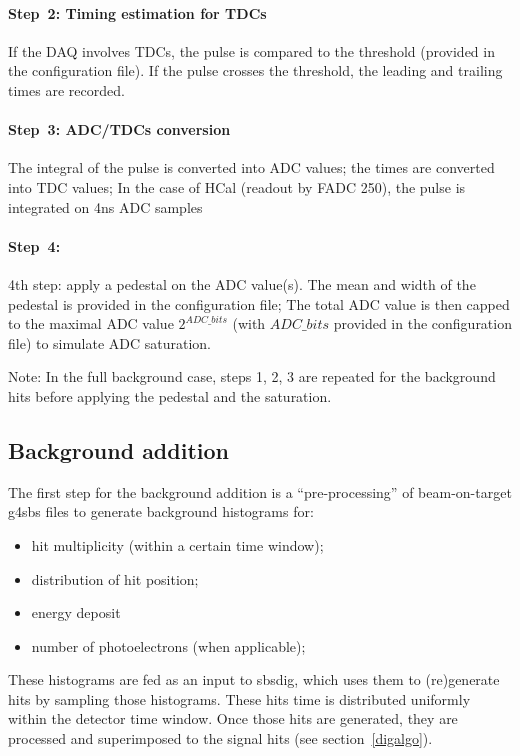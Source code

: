 \paragraph{Step~2: Timing estimation for TDCs}
If the DAQ involves TDCs, the pulse is compared to the threshold (provided in the configuration file).
If the pulse crosses the threshold, the leading and 
trailing times are recorded.

\paragraph{Step~3: ADC/TDCs conversion}
The integral of the pulse is converted into ADC values; 
the times are converted into TDC values; In the case of HCal 
(readout by FADC 250), the pulse is integrated on 4ns ADC samples 

\paragraph{Step~4: }

4th step: apply a pedestal on the ADC value(s). The mean and width of the pedestal is provided in the configuration file;
The total ADC value is then capped to the maximal ADC value  $2^{ADC\_bits}$ (with $ADC\_bits$ provided in the configuration file) to simulate ADC saturation.

Note: In the full background case, steps 1, 2, 3 are repeated for the background hits before applying the pedestal and the saturation.

\subsection{Background addition}
\label{bkgdadd}

The first step for the background addition is a ``pre-processing'' of beam-on-target g4sbs files to generate background histograms for:
%
\begin{itemize}
\item{hit multiplicity (within a certain time window);}
\item{distribution of hit position;}
\item{energy deposit}
\item{number of photoelectrons (when applicable);}
\end{itemize}
%
These histograms are fed as an input to sbsdig, which uses them to (re)generate hits by sampling
those histograms.
These hits time is distributed uniformly within the detector time window.
Once those hits are generated, they are processed and superimposed to the signal hits (see section~\ref{digalgo}).
